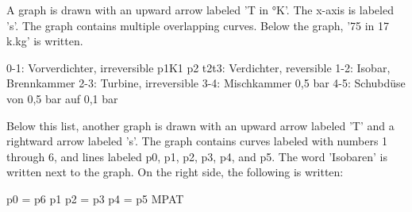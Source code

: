 A graph is drawn with an upward arrow labeled 'T in °K'. The x-axis is labeled 's'. The graph contains multiple overlapping curves. Below the graph, '75 in 17 k.kg' is written.

0-1: Vorverdichter, irreversible  
p1K1 p2  
t2t3: Verdichter, reversible  
1-2: Isobar, Brennkammer  
2-3: Turbine, irreversible  
3-4: Mischkammer 0,5 bar  
4-5: Schubdüse von 0,5 bar auf 0,1 bar  

Below this list, another graph is drawn with an upward arrow labeled 'T' and a rightward arrow labeled 's'. The graph contains curves labeled with numbers 1 through 6, and lines labeled p0, p1, p2, p3, p4, and p5. The word 'Isobaren' is written next to the graph. On the right side, the following is written:

p0 = p6  
p1  
p2 = p3  
p4 = p5  
MPAT